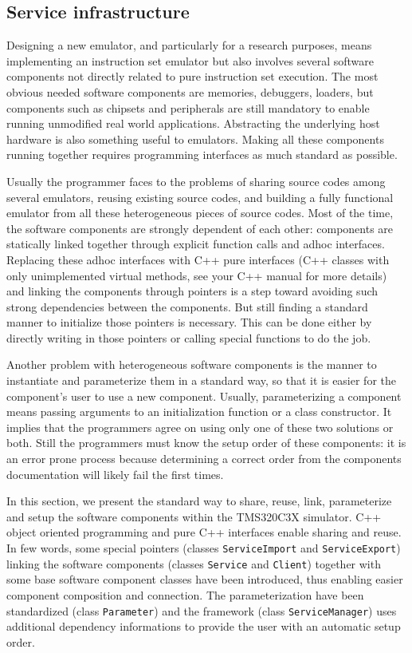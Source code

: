 \subsection{Service infrastructure}
\label{tms320c3x_service_infrastructure}

Designing a new emulator, and particularly for a research purposes, means implementing an instruction set emulator but also involves several software components not directly related to pure instruction set execution.
The most obvious needed software components are memories, debuggers, loaders, but components such as chipsets and peripherals are still mandatory to enable running unmodified real world applications.
Abstracting the underlying host hardware is also something useful to emulators.
Making all these components running together requires programming interfaces as much standard as possible.

Usually the programmer faces to the problems of sharing source codes among several emulators, reusing existing source codes, and building a fully functional emulator from all these heterogeneous pieces of source codes.
Most of the time, the software components are strongly dependent of each other: components are statically linked together through explicit function calls and adhoc interfaces.
Replacing these adhoc interfaces with C++ pure interfaces (C++ classes with only unimplemented virtual methods, see your C++ manual for more details) and linking the components through pointers is a step toward avoiding such strong dependencies between the components. But still finding a standard manner to initialize those pointers is necessary. This can be done either by directly writing in those pointers or calling special functions to do the job.

Another problem with heterogeneous software components is the manner to instantiate and parameterize them in a standard way, so that it is easier for the component's user to use a new component.
Usually, parameterizing a component means passing arguments to an initialization function or a class constructor. It implies that the programmers agree on using only one of these two solutions or both.
Still the programmers must know the setup order of these components: it is an error prone process because determining a correct order from the components documentation will likely fail the first times.

In this section, we present the standard way to share, reuse, link, parameterize and setup the software components within the TMS320C3X simulator.
C++ object oriented programming and pure C++ interfaces enable sharing and reuse.
In few words, some special pointers (classes \texttt{ServiceImport} and \texttt{ServiceExport}) linking the software components (classes \texttt{Service} and \texttt{Client}) together with some base software component classes have been introduced, thus enabling easier component composition and connection.
The parameterization have been standardized (class \texttt{Parameter}) and the framework (class \texttt{ServiceManager}) uses additional dependency informations to provide the user with an automatic setup order.

